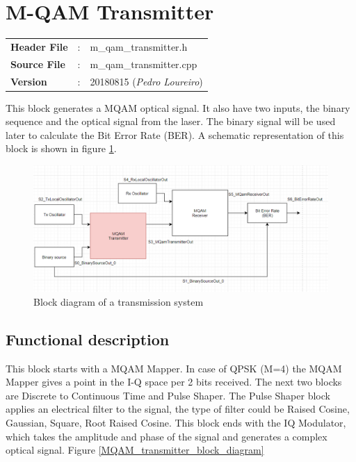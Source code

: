 \clearpage

\section{M-QAM Transmitter}

\begin{tcolorbox}	
	\begin{tabular}{p{2.75cm} p{0.2cm} p{10.5cm}} 	
		\textbf{Header File}   &:& m\_qam\_transmitter.h \\
		\textbf{Source File}   &:& m\_qam\_transmitter.cpp \\
        \textbf{Version}       &:& 20180815 (\emph{Pedro Loureiro})\\
	\end{tabular}
\end{tcolorbox}

This block generates a MQAM optical signal. It also have two inputs, the binary sequence and the optical signal from the laser. The binary signal will be used later to calculate the Bit Error Rate (BER).  A schematic representation of this block is shown in figure \ref{MQAM_transmitter_block_diagram_simple}.

\begin{figure}[H]
	\centering
	\includegraphics[scale=0.75]{./lib/m_qam_transmitter/figure_PLoureiro/MQAM_Transmitter_0.png}
	\caption{Block diagram of a transmission system}\label{MQAM_transmitter_block_diagram_simple}
\end{figure}

\subsection*{Functional description}
This block starts with a MQAM Mapper. In case of QPSK (M=4) the MQAM Mapper gives a point in the I-Q space per 2 bits received. The next two blocks are Discrete to Continuous Time and Pulse Shaper. The Pulse Shaper block applies an electrical filter to the signal, the type of filter could be Raised Cosine, Gaussian, Square, Root Raised Cosine. This block ends with the IQ Modulator, which takes the amplitude and phase of the signal and generates a complex optical signal. Figure \ref{MQAM_transmitter_block_diagram}

